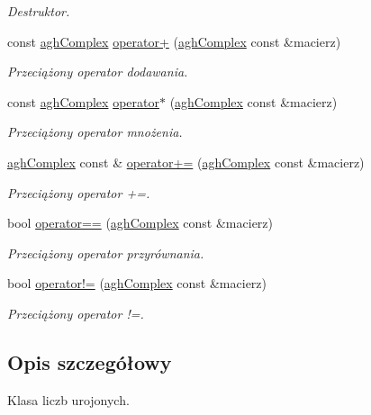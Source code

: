 \begin{DoxyCompactItemize}
\begin{DoxyCompactList}\small\item\em Destruktor. \end{DoxyCompactList}\item 
const \hyperlink{classaghComplex}{agh\-Complex} \hyperlink{classaghComplex_a769be15671438b92dc4f75bfc8ecc587}{operator+} (\hyperlink{classaghComplex}{agh\-Complex} const \&macierz)
\begin{DoxyCompactList}\small\item\em Przeciążony operator dodawania. \end{DoxyCompactList}\item 
const \hyperlink{classaghComplex}{agh\-Complex} \hyperlink{classaghComplex_a6f732e7db9cfa04fdcc9fbcf36dc0320}{operator$\ast$} (\hyperlink{classaghComplex}{agh\-Complex} const \&macierz)
\begin{DoxyCompactList}\small\item\em Przeciążony operator mnożenia. \end{DoxyCompactList}\item 
\hyperlink{classaghComplex}{agh\-Complex} const \& \hyperlink{classaghComplex_a76ebc59f38f9bc395afc7caf8dd676e8}{operator+=} (\hyperlink{classaghComplex}{agh\-Complex} const \&macierz)
\begin{DoxyCompactList}\small\item\em Przeciążony operator +=. \end{DoxyCompactList}\item 
bool \hyperlink{classaghComplex_a64b5e0f0e120db7f8dceca8816c4776c}{operator==} (\hyperlink{classaghComplex}{agh\-Complex} const \&macierz)
\begin{DoxyCompactList}\small\item\em Przeciążony operator przyrównania. \end{DoxyCompactList}\item 
bool \hyperlink{classaghComplex_a9bbf3660daae644b07a6012405126ab5}{operator!=} (\hyperlink{classaghComplex}{agh\-Complex} const \&macierz)
\begin{DoxyCompactList}\small\item\em Przeciążony operator !=. \end{DoxyCompactList}\end{DoxyCompactItemize}


\subsection{Opis szczegółowy}
Klasa liczb urojonych. 

